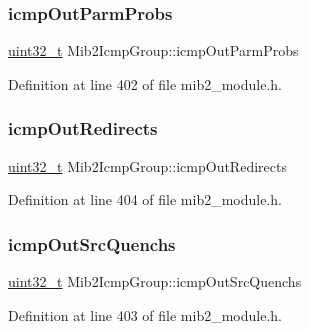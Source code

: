 \subsubsection{\texorpdfstring{icmp\+Out\+Parm\+Probs}{icmpOutParmProbs}}
{\footnotesize\ttfamily \hyperlink{stdint_8h_a435d1572bf3f880d55459d9805097f62}{uint32\+\_\+t} Mib2\+Icmp\+Group\+::icmp\+Out\+Parm\+Probs}



Definition at line 402 of file mib2\+\_\+module.\+h.

\mbox{\label{structMib2IcmpGroup_a9f69dd93ddbd5da045e29ab39457400e}} 
\subsubsection{\texorpdfstring{icmp\+Out\+Redirects}{icmpOutRedirects}}
{\footnotesize\ttfamily \hyperlink{stdint_8h_a435d1572bf3f880d55459d9805097f62}{uint32\+\_\+t} Mib2\+Icmp\+Group\+::icmp\+Out\+Redirects}



Definition at line 404 of file mib2\+\_\+module.\+h.

\mbox{\label{structMib2IcmpGroup_a2c3339b6b2a71b3a0bd0ea528123fb6c}} 
\subsubsection{\texorpdfstring{icmp\+Out\+Src\+Quenchs}{icmpOutSrcQuenchs}}
{\footnotesize\ttfamily \hyperlink{stdint_8h_a435d1572bf3f880d55459d9805097f62}{uint32\+\_\+t} Mib2\+Icmp\+Group\+::icmp\+Out\+Src\+Quenchs}



Definition at line 403 of file mib2\+\_\+module.\+h.

\mbox{\label{structMib2IcmpGroup_adb2907e86619392f6df0b0f2c4c8d7c7}} 

